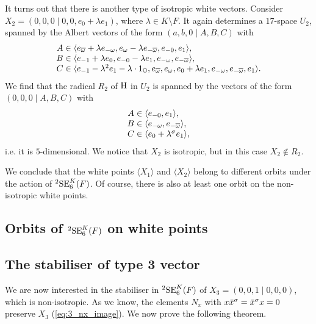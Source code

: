 It turns out that there is another type of isotropic white vectors. Consider 
$X_2 = (0,0,0 \mid 0,0,e_0 + \lambda e_1)$, where $\lambda \in K\setminus F$. It again determines a 
$17$-space $U_2$, spanned by the Albert vectors of the form $(a,b,0\mid A,B,C)$ with 
\begin{equation}
	\begin{array}{r@{\;}c@{\;}l}
		A & \in & \langle e_{\bar{\omega}}+\lambda e_{-\omega}, e_{\omega}-\lambda e_{-\bar{\omega}}
		, e_{-0}, e_1
		\rangle, \\
		B & \in & \langle e_{-1}+\lambda e_0, e_{-0} - \lambda e_1,
	e_{-\omega}, e_{-\bar{\omega}}  \rangle, \\
		C & \in & \langle e_{-1}-\lambda^2 e_1 - \lambda \cdot 1_{\O}, e_{\bar{\omega}}, e_{\omega},
	e_0 + \lambda e_1, e_{-\omega}, e_{-\bar{\omega}}, e_1 \rangle.
	\end{array}
\end{equation}
We find that the radical $R_2$ of $\mathrm{H}$ in $U_2$ is spanned by the vectors of the form 
$(0,0,0\mid A,B,C)$ with 
\begin{equation}
	\begin{array}{r@{\;}c@{\;}l}
		A & \in & \langle e_{-0}, e_1 \rangle, \\
		B & \in & \langle e_{-\omega}, e_{-\bar{\omega}} \rangle, \\
		C & \in & \langle e_0 + \lambda^{\s} e_1 \rangle,
	\end{array}
\end{equation}
i.e. it is $5$-dimensional. We notice that $X_2$ is isotropic, but in this case $X_2 \not\in R_2$.

We conclude that the white points $\langle X_1 \rangle$ and $\langle X_2 \rangle$ belong to different
orbits under the action of ${}^2\mathrm{SE}_6^K(F)$. Of course, there is also at least one orbit on the 
non-isotropic white points. 

\subsection{Orbits of ${}^2\mathrm{SE}_6^K(F)$ on white points}

\subsection{The stabiliser of type 3 vector}

We are now interested in the stabiliser in ${}^2\mathrm{SE}_6^K(F)$ of 
$X_3 = (0,0,1\mid 0,0,0)$, which is non-isotropic. As we know, the elements
$N_x$ with $x\ovx^{\s} = \ovx^{\s}x = 0$ preserve $X_3$ (\ref{eq:3_nx_image}).
We now prove the following theorem.

